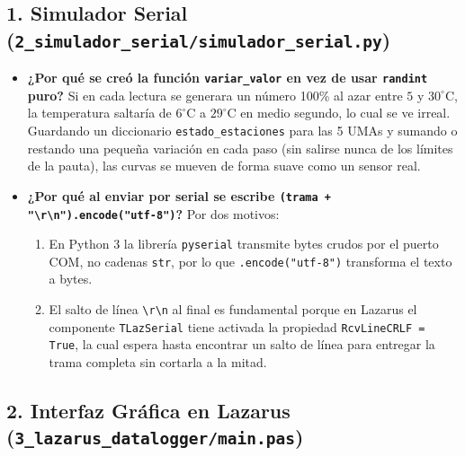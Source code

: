 \documentclass[11pt,a4paper]{article}
\begin{document}
\subsection{1. Simulador Serial (\texttt{2\_simulador\_serial/simulador\_serial.py})}

\begin{itemize}[leftmargin=1.5em]
    \item \textbf{¿Por qué se creó la función \texttt{variar\_valor} en vez de usar \texttt{randint} puro?}
    Si en cada lectura se generara un número 100\% al azar entre $5$ y $30^\circ\text{C}$, la temperatura saltaría de $6^\circ\text{C}$ a $29^\circ\text{C}$ en medio segundo, lo cual se ve irreal. Guardando un diccionario \texttt{estado\_estaciones} para las 5 UMAs y sumando o restando una pequeña variación en cada paso (sin salirse nunca de los límites de la pauta), las curvas se mueven de forma suave como un sensor real.
    
    \item \textbf{¿Por qué al enviar por serial se escribe \texttt{(trama + "\textbackslash r\textbackslash n").encode("utf-8")}?}
    Por dos motivos:
    \begin{enumerate}
        \item En Python 3 la librería \texttt{pyserial} transmite bytes crudos por el puerto COM, no cadenas \texttt{str}, por lo que \texttt{.encode("utf-8")} transforma el texto a bytes.
        \item El salto de línea \texttt{\textbackslash r\textbackslash n} al final es fundamental porque en Lazarus el componente \texttt{TLazSerial} tiene activada la propiedad \texttt{RcvLineCRLF = True}, la cual espera hasta encontrar un salto de línea para entregar la trama completa sin cortarla a la mitad.
    \end{enumerate}
\end{itemize}

\subsection{2. Interfaz Gráfica en Lazarus (\texttt{3\_lazarus\_datalogger/main.pas})}
\end{document}
